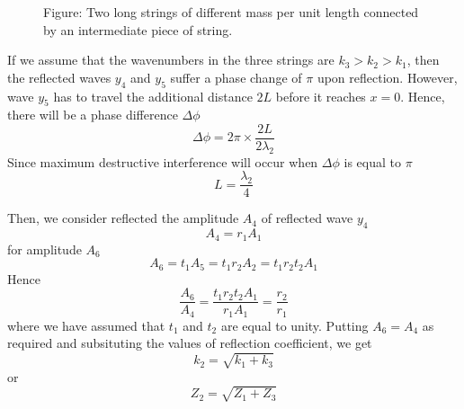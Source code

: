 \documentclass[../../../main.tex]{subfiles}
\begin{document}
\begin{figure*}
    \centering
    \caption*{Figure: Two long strings of different mass per unit length connected by an intermediate piece of string.}
\end{figure*}

If we assume that the wavenumbers in the three strings are $k_3 > k_2 > k_1$, then the reﬂected waves $y_4$ and $y_5$ suffer a phase change of $\pi$ upon reﬂection. However, wave $y_5$ has to travel the additional distance $2L$ before it reaches $x=0$. Hence, there will be a phase difference $\Delta \phi$
\begin{equation*}
    \Delta\phi=2\pi\times \frac{2L}{2\lambda_2}
\end{equation*}
Since maximum destructive interference will occur when $\Delta \phi$ is equal to $\pi$
\begin{equation*}
    L=\frac{\lambda_2}{4}
\end{equation*}

Then, we consider reflected the amplitude $A_4$ of reﬂected wave $y_4$
\begin{equation*}
    A_4=r_{1}A_1
\end{equation*}
for amplitude $A_6$
\begin{equation*}
    A_6=t_1A_5=t_1r_2A_2=t_1r_2t_2A_1
\end{equation*}
Hence
\begin{equation*}
    \frac{A_6}{A_4}=\frac{t_1r_2t_2A_1}{r_{1}A_1}=\frac{r_2}{r_1}
\end{equation*}
where we have assumed that $t_1$ and $t_2$ are equal to unity. Putting $A_6 = A_4$ as required and subsituting the values of reflection coefficient, we get
\begin{equation*}
    k_2=\sqrt{k_1+k_3}
\end{equation*}
or
\begin{equation*}
    Z_2=\sqrt{Z_1+Z_3}
\end{equation*}
\end{document}
